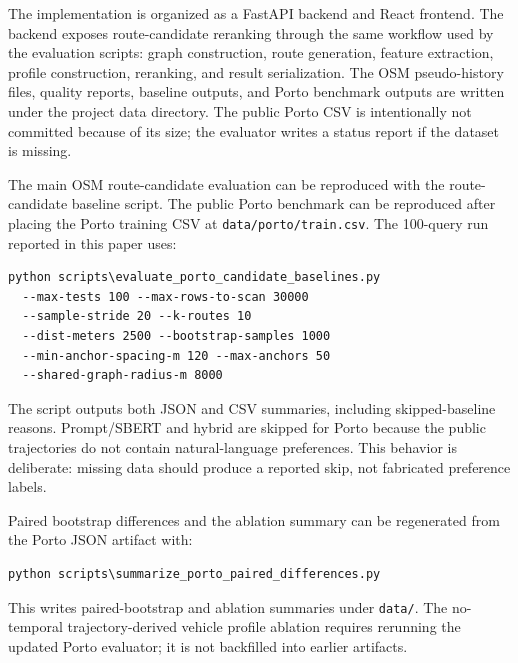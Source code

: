 The implementation is organized as a FastAPI backend and React frontend. The backend exposes route-candidate reranking through the same workflow used by the evaluation scripts: graph construction, route generation, feature extraction, profile construction, reranking, and result serialization. The OSM pseudo-history files, quality reports, baseline outputs, and Porto benchmark outputs are written under the project data directory. The public Porto CSV is intentionally not committed because of its size; the evaluator writes a status report if the dataset is missing.

The main OSM route-candidate evaluation can be reproduced with the route-candidate baseline script. The public Porto benchmark can be reproduced after placing the Porto training CSV at \texttt{data/porto/train.csv}. The 100-query run reported in this paper uses:

\begin{verbatim}
python scripts\evaluate_porto_candidate_baselines.py
  --max-tests 100 --max-rows-to-scan 30000
  --sample-stride 20 --k-routes 10
  --dist-meters 2500 --bootstrap-samples 1000
  --min-anchor-spacing-m 120 --max-anchors 50
  --shared-graph-radius-m 8000
\end{verbatim}

The script outputs both JSON and CSV summaries, including skipped-baseline reasons. Prompt/SBERT and hybrid are skipped for Porto because the public trajectories do not contain natural-language preferences. This behavior is deliberate: missing data should produce a reported skip, not fabricated preference labels.

Paired bootstrap differences and the ablation summary can be regenerated from the Porto JSON artifact with:

\begin{verbatim}
python scripts\summarize_porto_paired_differences.py
\end{verbatim}

This writes paired-bootstrap and ablation summaries under \texttt{data/}. The no-temporal trajectory-derived vehicle profile ablation requires rerunning the updated Porto evaluator; it is not backfilled into earlier artifacts.
